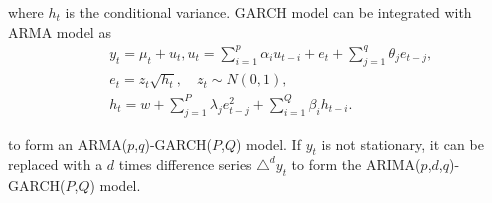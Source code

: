 where $h_t$ is the conditional variance. GARCH model can be integrated with ARMA model as
\begin{eqnarray}
&& y_t = \mu_t + u_t,  u_t = \sum_{i=1}^{p} {\alpha_i{u_{t-i}}} + e_t+ \sum_{j=1}^{q} {\theta_j{e_{t-j}}},\nonumber\\
&& e_t = z_t{\sqrt{h_t}},\quad z_t\sim N(0,1),\nonumber\\
&& h_t = w+\sum_{j=1}^{P} {\lambda_j{e_{t-j}^2}}+\sum_{i=1}^{Q}{\beta_i{h_{t-i}}}.
\end{eqnarray}

to form an ARMA($p$,$q$)-GARCH($P$,$Q$) model. If $y_t$ is not stationary, it can be replaced with a $d$ times difference series $\triangle^d$$y_t$  to form the ARIMA($p$,$d$,$q$)-GARCH($P$,$Q$) model.



